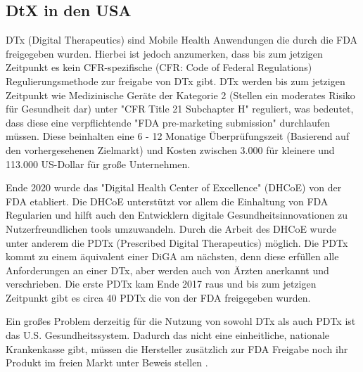 \documentclass{article}
\begin{document}
		\subsection{DtX in den USA}
			DTx (Digital Therapeutics) sind Mobile Health Anwendungen die durch die FDA freigegeben wurden. Hierbei ist jedoch anzumerken, dass bis zum jetzigen Zeitpunkt es kein CFR-spezifische (CFR: Code of Federal Regulations) Regulierungsmethode zur freigabe von DTx gibt. DTx werden bis zum jetzigen Zeitpunkt wie Medizinische Geräte der Kategorie 2 (Stellen ein moderates Risiko für Gesundheit dar) unter "CFR Title 21 Subchapter H" reguliert, was bedeutet, dass diese eine verpflichtende "FDA pre-marketing submission" durchlaufen müssen. Diese beinhalten eine 6 - 12 Monatige Überprüfungszeit (Basierend auf den vorhergesehenen Zielmarkt) und Kosten zwischen 3.000 für kleinere und 113.000 US-Dollar für große Unternehmen.\par
			Ende 2020 wurde das "Digital Health Center of Excellence" (DHCoE) von der FDA etabliert. Die DHCoE unterstützt vor allem die Einhaltung von FDA Regularien und hilft auch den Entwicklern digitale Gesundheitsinnovationen zu Nutzerfreundlichen tools umzuwandeln. Durch die Arbeit des DHCoE wurde unter anderem die PDTx (Prescribed Digital Therapeutics) möglich. Die PDTx kommt zu einem äquivalent einer DiGA am nächsten, denn diese erfüllen alle Anforderungen an einer DTx, aber werden auch von Ärzten anerkannt und verschrieben. Die erste PDTx kam Ende 2017 raus und bis zum jetzigen Zeitpunkt gibt es circa 40 PDTx die von der FDA freigegeben wurden.\par
			Ein großes Problem derzeitig für die Nutzung von sowohl DTx als auch PDTx ist das U.S. Gesundheitssystem. Dadurch das nicht eine einheitliche, nationale Krankenkasse gibt, müssen die Hersteller zusätzlich zur FDA Freigabe noch ihr Produkt im freien Markt unter Beweis stellen \cite{dtx-usa}.
\end{document}
